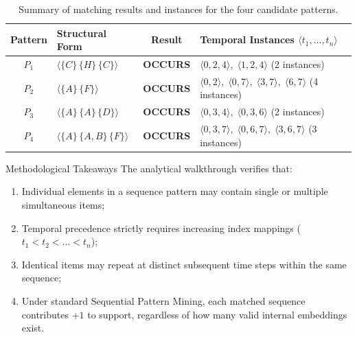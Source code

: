 \begin{table}[htbp]
\centering
\small
\renewcommand{\arraystretch}{1.25}
\begin{tabularx}{\textwidth}{c Y c Y}
\toprule
\textbf{Pattern} & \textbf{Structural Form} & \textbf{Result} & \textbf{Temporal Instances $\langle t_1, \dots, t_n \rangle$} \\
\midrule
$P_1$ & $\langle \{C\} \, \{H\} \, \{C\} \rangle$ & \textbf{OCCURS} & $\langle 0, 2, 4 \rangle, \; \langle 1, 2, 4 \rangle$ (2 instances) \\
$P_2$ & $\langle \{A\} \, \{F\} \rangle$ & \textbf{OCCURS} & $\langle 0, 2 \rangle, \; \langle 0, 7 \rangle, \; \langle 3, 7 \rangle, \; \langle 6, 7 \rangle$ (4 instances) \\
$P_3$ & $\langle \{A\} \, \{A\} \, \{D\} \rangle$ & \textbf{OCCURS} & $\langle 0, 3, 4 \rangle, \; \langle 0, 3, 6 \rangle$ (2 instances) \\
$P_4$ & $\langle \{A\} \, \{A, B\} \, \{F\} \rangle$ & \textbf{OCCURS} & $\langle 0, 3, 7 \rangle, \; \langle 0, 6, 7 \rangle, \; \langle 3, 6, 7 \rangle$ (3 instances) \\
\bottomrule
\end{tabularx}
\caption{Summary of matching results and instances for the four candidate patterns.}
\label{tab:dm-seq-exercise-summary-en}
\end{table}

\begin{noteblock}{Methodological Takeaways}
    The analytical walkthrough verifies that:
    \begin{enumerate}[noitemsep]
        \item Individual elements in a sequence pattern may contain single or multiple simultaneous items;
        \item Temporal precedence strictly requires increasing index mappings ($t_1 < t_2 < \dots < t_n$);
        \item Identical items may repeat at distinct subsequent time steps within the same sequence;
        \item Under standard Sequential Pattern Mining, each matched sequence contributes $+1$ to support, regardless of how many valid internal embeddings exist.
    \end{enumerate}
\end{noteblock}
